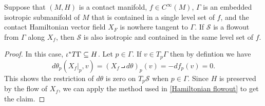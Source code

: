 \begin{theorem}\label{contact flowout}
Suppose that $(M,H)$ is a contact manifold, $f\in C^\infty(M)$, $\Gamma$ is an embedded isotropic submanifold of $M$ that is contained in a single level set of $f$, and the contact Hamiltonian vector field $X_F$ is nowhere tangent to $\Gamma$. If $\mathcal{S}$ is a flowout from $\Gamma$ along $X_f$, then $\mathcal{S}$ is also isotropic and contained in the same level set of $f$.
\end{theorem}
\begin{proof}
In this case, $\iota^*T\Gamma\subseteq H$. Let $p\in\Gamma$. If $v\in T_p\Gamma$ then by defintion we have
\[d\theta_p(X_f|_p,v)=(X_f\intprod d\theta)_p(v)=-df_p(v)=0.\]
This shows the restriction of $d\theta$ is zero on $T_p\mathcal{S}$ when $p\in\Gamma$. Since $H$ is preserved by the flow of $X_f$, we can apply the method used in \cref{Hamiltonian flowout} to get the claim.
\end{proof}

